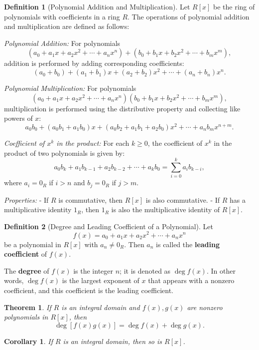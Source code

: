 \documentclass{article}
\newtheorem{theorem}{Theorem}[section]
\newtheorem{corollary}{Corollary}[section]
\theoremstyle{definition}
\newtheorem{definition}{Definition}[section]
\theoremstyle{remark}
\begin{document}
\begin{definition}[Polynomial Addition and Multiplication]
Let $R[x]$ be the ring of polynomials with coefficients in a ring $R$. The operations of polynomial addition and multiplication are defined as follows:

\textit{Polynomial Addition:}  
For polynomials
\[
(a_0 + a_1x + a_2x^2 + \cdots + a_nx^n) + (b_0 + b_1x + b_2x^2 + \cdots + b_mx^m),
\]
addition is performed by adding corresponding coefficients:
\[
(a_0 + b_0) + (a_1 + b_1)x + (a_2 + b_2)x^2 + \cdots + (a_n + b_n)x^n.
\]

\textit{Polynomial Multiplication:}  
For polynomials
\[
(a_0 + a_1x + a_2x^2 + \cdots + a_nx^n)(b_0 + b_1x + b_2x^2 + \cdots + b_mx^m),
\]
multiplication is performed using the distributive property and collecting like powers of $x$:
\[
a_0b_0 + (a_0b_1 + a_1b_0)x + (a_0b_2 + a_1b_1 + a_2b_0)x^2 + \cdots + a_n b_m x^{n+m}.
\]

\textit{Coefficient of $x^k$ in the product:}  
For each $k \geq 0$, the coefficient of $x^k$ in the product of two polynomials is given by:
\[
a_0b_k + a_1b_{k-1} + a_2b_{k-2} + \cdots + a_k b_0 = \sum_{i=0}^{k} a_i b_{k-i},
\]
where $a_i = 0_R$ if $i > n$ and $b_j = 0_R$ if $j > m$.

\textit{Properties:}
- If $R$ is commutative, then $R[x]$ is also commutative.
- If $R$ has a multiplicative identity $1_R$, then $1_R$ is also the multiplicative identity of $R[x]$.
\end{definition}


\begin{definition}[Degree and Leading Coefficient of a Polynomial]
Let 
\[
f(x) = a_0 + a_1x + a_2x^2 + \cdots + a_nx^n
\]
be a polynomial in $R[x]$ with $a_n \neq 0_R$. Then $a_n$ is called the \textbf{leading coefficient} of $f(x)$. 

The \textbf{degree} of $f(x)$ is the integer $n$; it is denoted as $\deg f(x)$. In other words, $\deg f(x)$ is the largest exponent of $x$ that appears with a nonzero coefficient, and this coefficient is the leading coefficient.
\end{definition}



\begin{theorem} \label{thm:degree of product}
If $R$ is an integral domain and $f(x), g(x)$ are nonzero polynomials in $R[x]$, then
\[
\deg[f(x)g(x)] = \deg f(x) + \deg g(x).
\]
\end{theorem}


\begin{corollary} \label{cor:integral domain of polynomials}
If $R$ is an integral domain, then so is $R[x]$.
\end{corollary}
\end{document}
